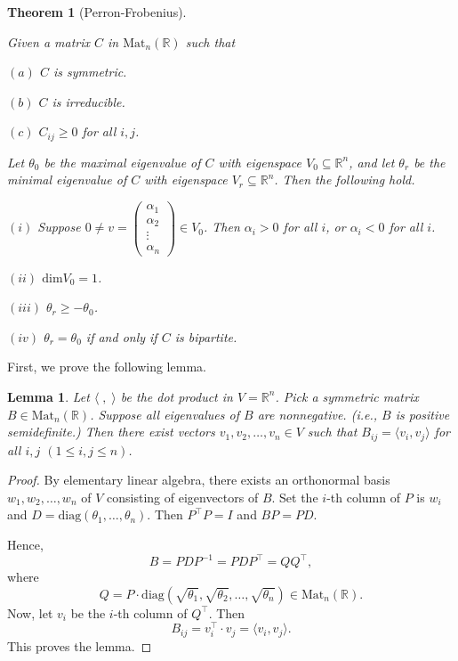\documentclass[
]{book}
\newtheorem{theorem}{Theorem}[chapter]
\newtheorem{lemma}{Lemma}[chapter]
\theoremstyle{definition}
\theoremstyle{definition}
\theoremstyle{definition}
\theoremstyle{definition}
\theoremstyle{remark}
\begin{document}
\begin{theorem}[Perron-Frobenius]
\protect\hypertarget{thm:pf}{}\label{thm:pf}

Given a matrix \(C\) in \(\mathrm{Mat}_n(\mathbb{R})\) such that

\((a)\) \(C\) is symmetric.

\((b)\) \(C\) is irreducible.

\((c)\) \(C_{ij} \geq 0\) for all \(i,j\).

Let \(\theta_0\) be the maximal eigenvalue of \(C\) with eigenspace \(V_0 \subseteq \mathbb{R}^n\), and let \(\theta_r\) be the minimal eigenvalue of \(C\) with eigenspace \(V_r \subseteq \mathbb{R}^n\). Then the following hold.

\((i)\) Suppose \(0\neq v = \begin{pmatrix}\alpha_1\\\alpha_2\\\vdots\\\alpha_n\end{pmatrix} \in V_0\). Then \(\alpha_i > 0\) for all \(i\), or \(\alpha_i < 0\) for all \(i\).

\((ii)\) \(\mathrm{dim}V_0 = 1\).

\((iii)\) \(\theta_r \geq -\theta_0\).

\((iv)\) \(\theta_r = \theta_0\) if and only if \(C\) is bipartite.

\end{theorem}

\hfill\break

First, we prove the following lemma.

\begin{lemma}
\protect\hypertarget{lem:pfl}{}\label{lem:pfl}Let \(\langle \;,\; \rangle\) be the dot product in \(V = \mathbb{R}^n\). Pick a symmetric matrix \(B \in \mathrm{Mat}_n(\mathbb{R})\). Suppose all eigenvalues of \(B\) are nonnegative. (i.e., \(B\) is positive semidefinite.) Then there exist vectors \(v_1, v_2, \ldots, v_n\in V\) such that \(B_{ij} = \langle v_i, v_j\rangle\) for all \(i,j\) \((1\leq i, j \leq n)\).
\end{lemma}

\begin{proof}
By elementary linear algebra, there exists an orthonormal basis \(w_1, w_2, \ldots, w_n\) of \(V\) consisting of eigenvectors of \(B\). Set the \(i\)-th column of \(P\) is \(w_i\) and \(D = \mathrm{diag}(\theta_1,\ldots, \theta_n)\). Then \(P^\top P = I\) and \(BP = PD\).

Hence,
\[B = PDP^{-1} = PDP^\top = QQ^\top,\]
where
\[Q = P\cdot \mathrm{diag}(\sqrt{\theta_1}, \sqrt{\theta_2}, \ldots, \sqrt{\theta_n}) \in \mathrm{Mat}_n(\mathbb{R}).\]
Now, let \(v_i\) be the \(i\)-th column of \(Q^\top\). Then
\[B_{ij} = v_i^\top\cdot v_j = \langle v_i, v_j\rangle.\]
This proves the lemma.
\end{proof}
\end{document}
